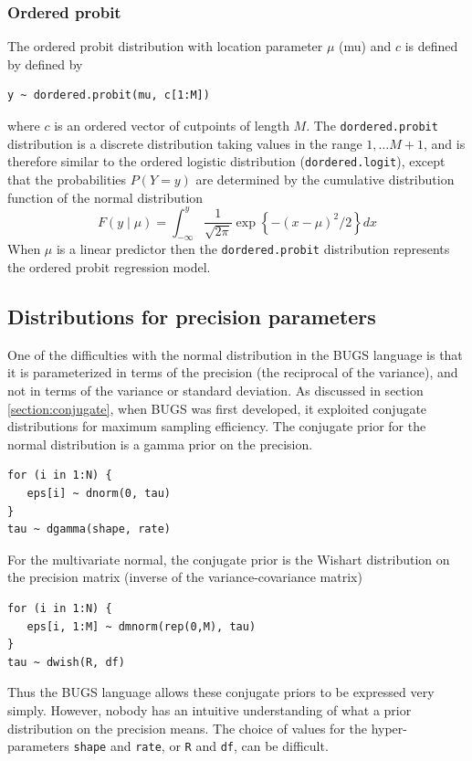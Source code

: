 \documentclass[11pt, a4paper, titlepage]{report}
\begin{document}
{\subsubsection{Ordered probit}

The ordered probit distribution with location parameter $\mu$ (mu)
and $c$ is defined by
defined by
\begin{verbatim}
y ~ dordered.probit(mu, c[1:M])
\end{verbatim}
where $c$ is an ordered vector of cutpoints of length $M$. The
\texttt{dordered.probit} distribution is a discrete distribution taking
values in the range $1, \ldots M+1$, and is therefore similar to the ordered
logistic distribution (\texttt{dordered.logit}), except that
the probabilities $P(Y=y)$ are determined by the cumulative
distribution function of the normal distribution
\[
F(y \mid \mu) = \int_{-\infty}^y \frac{1}{\sqrt{2\pi}}
\exp\left\{ -(x - \mu)^2 /2 \right\} dx
\]
When $\mu$ is a linear predictor then the \texttt{dordered.probit}
distribution represents the ordered probit regression model.

\subsection{Distributions for precision parameters}
\label{section:glm:precision}

One of the difficulties with the normal distribution in the BUGS
language is that it is parameterized in terms of the precision (the
reciprocal of the variance), and not in terms of the variance or
standard deviation. As discussed in section \ref{section:conjugate},
when BUGS was first developed, it exploited conjugate distributions
for maximum sampling efficiency.  The conjugate prior for the normal
distribution is a gamma prior on the precision.
\begin{verbatim}
for (i in 1:N) {
   eps[i] ~ dnorm(0, tau)
}
tau ~ dgamma(shape, rate)
\end{verbatim}
For the multivariate normal, the conjugate prior is the Wishart
distribution on the precision matrix (inverse of the
variance-covariance matrix)
\begin{verbatim}
for (i in 1:N) {
   eps[i, 1:M] ~ dmnorm(rep(0,M), tau)
}
tau ~ dwish(R, df)
\end{verbatim}
Thus the BUGS language allows these conjugate priors to be expressed
very simply. However, nobody has an intuitive understanding of what a
prior distribution on the precision means. The choice of values for
the hyper-parameters \texttt{shape} and \texttt{rate}, or \texttt{R}
and \texttt{df}, can be difficult.

}
\end{document}
